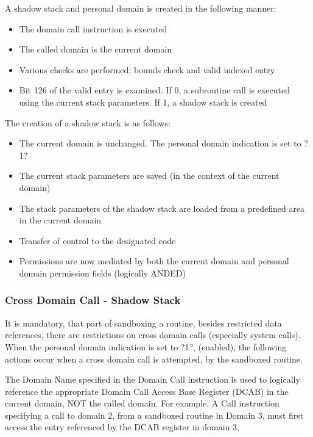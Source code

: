 \documentclass{article}
\begin{document}
\begin{appendices}
A shadow stack and personal domain is created in the following manner:

\begin{itemize}
\item The domain call instruction is executed
\item The called domain is the current domain
\item Various checks are performed; bounds check and valid indexed entry
\item Bit 126 of the valid entry is examined.  If 0, a subroutine call is executed using the current stack parameters.  If 1, a shadow stack is created
\end{itemize}

The creation of a shadow stack is as follows:

\begin{itemize}
\item The current domain is unchanged.  The personal domain indication is set to ?1?
\item The  current stack parameters are saved (in the context of the current domain)
\item The stack parameters of the shadow stack are loaded from a predefined area in the current domain
\item Transfer of control to the designated code
\item Permissions are now mediated by both the current domain and personal domain permission fields (logically ANDED)
\end{itemize}

\subsubsection{Cross Domain Call - Shadow Stack}

It is mandatory,  that part of sandboxing a routine, besides restricted data references,  there are restrictions on cross domain calls (especially system calls). When  the personal domain indication is set to ?1?,  (enabled),   the following actions occur when a cross domain call is attempted,  by the sandboxed routine.

The Domain Name specified in the Domain Call instruction  is used to logically reference the appropriate Domain Call Access Base Register (DCAB)  in the current domain,  NOT the called domain.  For example.  A Call instruction specifying a call to domain 2,  from a sandboxed routine in Domain 3,  must first access the  entry referenced by the DCAB register in domain 3,



\end{appendices}
\end{document}
